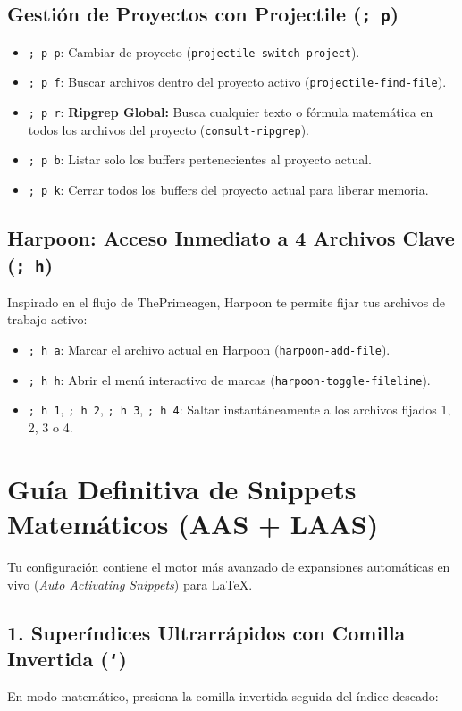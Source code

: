 \documentclass[11pt,book,spanish,alphabetic]{apuntes-scr}
\begin{document}
\section{Gestión de Proyectos con Projectile (\texttt{; p})}
\begin{itemize}[leftmargin=8mm]
    \item \texttt{; p p}: Cambiar de proyecto (\texttt{projectile-switch-project}).
    \item \texttt{; p f}: Buscar archivos dentro del proyecto activo (\texttt{projectile-find-file}).
    \item \texttt{; p r}: \textbf{Ripgrep Global:} Busca cualquier texto o fórmula matemática en todos los archivos del proyecto (\texttt{consult-ripgrep}).
    \item \texttt{; p b}: Listar solo los buffers pertenecientes al proyecto actual.
    \item \texttt{; p k}: Cerrar todos los buffers del proyecto actual para liberar memoria.
\end{itemize}

\section{Harpoon: Acceso Inmediato a 4 Archivos Clave (\texttt{; h})}
Inspirado en el flujo de ThePrimeagen, Harpoon te permite fijar tus archivos de trabajo activo:
\begin{itemize}[leftmargin=8mm]
    \item \texttt{; h a}: Marcar el archivo actual en Harpoon (\texttt{harpoon-add-file}).
    \item \texttt{; h h}: Abrir el menú interactivo de marcas (\texttt{harpoon-toggle-fileline}).
    \item \texttt{; h 1}, \texttt{; h 2}, \texttt{; h 3}, \texttt{; h 4}: Saltar instantáneamente a los archivos fijados 1, 2, 3 o 4.
\end{itemize}

\chapter{Guía Definitiva de Snippets Matemáticos (AAS + LAAS)}

Tu configuración contiene el motor más avanzado de expansiones automáticas en vivo (\textit{Auto Activating Snippets}) para \LaTeX.

\section{1. Superíndices Ultrarrápidos con Comilla Invertida (\texttt{`})}
En modo matemático, presiona la comilla invertida seguida del índice deseado:
\end{document}
